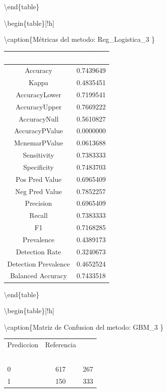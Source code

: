 \documentclass[]{article}
\begin{document}
\textbackslash{}end\{table\}

\textbackslash{}begin\{table\}{[}!h{]}

\textbackslash{}caption\{\label{tab:metricas_Reg_Logistica_3}Métricas
del metodo: Reg\_Logistica\_3 \} \centering

\begin{tabular}[t]{cc}
\toprule
\rowcolor{black}  \multicolumn{1}{c}{\textcolor{white}{\textbf{metricas}}} & \multicolumn{1}{c}{\textcolor{white}{\textbf{valor}}}\\
\midrule
\rowcolor{gray!6}  Accuracy & 0.7439649\\
Kappa & 0.4835451\\
\rowcolor{gray!6}  AccuracyLower & 0.7199541\\
AccuracyUpper & 0.7669222\\
\rowcolor{gray!6}  AccuracyNull & 0.5610827\\
\addlinespace
AccuracyPValue & 0.0000000\\
\rowcolor{gray!6}  McnemarPValue & 0.0613688\\
Sensitivity & 0.7383333\\
\rowcolor{gray!6}  Specificity & 0.7483703\\
Pos Pred Value & 0.6965409\\
\addlinespace
\rowcolor{gray!6}  Neg Pred Value & 0.7852257\\
Precision & 0.6965409\\
\rowcolor{gray!6}  Recall & 0.7383333\\
F1 & 0.7168285\\
\rowcolor{gray!6}  Prevalence & 0.4389173\\
\addlinespace
Detection Rate & 0.3240673\\
\rowcolor{gray!6}  Detection Prevalence & 0.4652524\\
Balanced Accuracy & 0.7433518\\
\bottomrule
\end{tabular}

\textbackslash{}end\{table\}

\textbackslash{}begin\{table\}{[}!h{]}

\textbackslash{}caption\{\label{tab:MatrizConf_GBM_3}Matriz de Confusion
del metodo: GBM\_3 \} \centering

\begin{tabular}[t]{lcc}
\toprule
\multicolumn{1}{c}{Prediccion} & \multicolumn{1}{c}{Referencia} & \multicolumn{1}{c}{ } \\
\cmidrule(l{3pt}r{3pt}){1-1} \cmidrule(l{3pt}r{3pt}){2-2}
\rowcolor{black}  \multicolumn{1}{c}{\textcolor{white}{\textbf{ }}} & \multicolumn{1}{c}{\textcolor{white}{\textbf{0}}} & \multicolumn{1}{c}{\textcolor{white}{\textbf{1}}}\\
\midrule
\rowcolor{gray!6}  0 & 617 & 267\\
1 & 150 & 333\\
\bottomrule
\end{tabular}
\end{document}
